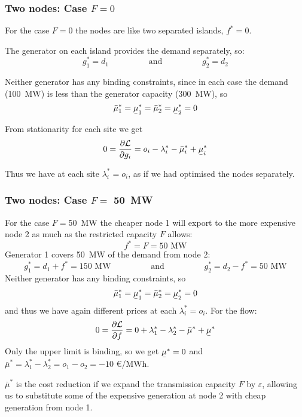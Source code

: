 \documentclass[10pt,aspectratio=169,dvipsnames]{beamer}
\def\l{\lambda}
\def\m{\mu}
\def\d{\partial}
\def\cL{\mathcal{L}}
\newcommand{\ubar}[1]{\text{\b{$#1$}}}
\begin{document}
\begin{frame}[fragile]
  \frametitle{Two nodes: Case $F = 0$ }

  For the case $F = 0$ the nodes are like two separated islands, $f^* = 0$.

  The generator on each island provides the demand separately, so:
  \begin{equation*}
    g_1^* = d_1  \hspace{2cm} \textrm{and} \hspace{2cm} g_2^* = d_2
  \end{equation*}

  Neither generator has any binding constraints, since in each case the demand (100~MW) is less than the generator capacity (300~MW), so
  \begin{equation*}
    \bar{\m}_1^* = \ubar{\m}_1^* =     \bar{\m}_2^* = \ubar{\m}_2^* = 0
  \end{equation*}

  From stationarity for each site we get
  \begin{equation*}
    0 = \frac{\d \cL}{\d g_{i}} = o_i - \l_i^*  -  \bar{\m}_i^* + \ubar{\m}_i^*
  \end{equation*}

  Thus we have at each site $\l_i^* = o_i$, as if we had optimised the nodes separately.


\end{frame}


\begin{frame}[fragile]
  \frametitle{Two nodes: Case $F =$ 50~MW }

  For the case $F = $50~MW the cheaper node 1 will export to the more
  expensive node 2 as much as the restricted capacity $F$ allows:
  \begin{equation*}
    f^* = F = 50\textrm{ MW}
  \end{equation*}
  Generator 1 covers 50~MW of the demand from node 2:
  \begin{equation*}
    g_1^* = d_1+f^* = 150\textrm{ MW}  \hspace{2cm} \textrm{and} \hspace{2cm} g_2^* = d_2 - f^* = 50\textrm{ MW}
  \end{equation*}
  Neither generator has any binding constraints, so
  \begin{equation*}
    \bar{\m}_1^* = \ubar{\m}_1^* =     \bar{\m}_2^* = \ubar{\m}_2^* = 0
  \end{equation*}
  and thus we have again different prices at each $\l_i^* = o_i$. For the flow:
  \begin{equation*}
    0 = \frac{\d \cL}{\d f} = 0 +  \l_1^* - \l_2^*  -  \bar{\m}^* + \ubar{\m}^*
  \end{equation*}
  Only the upper limit is binding, so we get $\ubar{\m}^* = 0$ and
    $\bar{\m}^* = \l_1^* - \l_2^* = o_1 - o_2 = -10 $ \euro/MWh.

$\bar{\m}^*$ is the cost reduction if we expand the transmission capacity $F$ by $\varepsilon$, allowing us to substitute some of the expensive generation at node 2 with cheap generation from node 1.


\end{frame}
\end{document}
